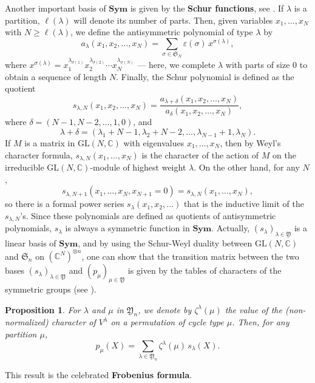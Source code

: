 \documentclass[smallextended,nospthms]{svjour3}
\newtheorem{proposition}[theorem]{Proposition}
\theoremstyle{remark}
\newcommand{\C}{\mathbb{C}}
\newcommand{\sym}{\mathfrak{S}}
\newcommand{\Sym}{\mathbf{Sym}}
\newcommand{\ym}{\mathfrak{Y}}
\newcommand{\GL}{\mathrm{GL}}
\newcommand{\eps}{\varepsilon}
\begin{document}
Another important basis of $\Sym$ is given by the \textbf{Schur functions}, see \cite[\S1.3]{Mac95}. If $\lambda$ is a partition, $\ell(\lambda)$ will denote its number of parts. Then, given variables $x_{1},\ldots,x_{N}$ with $N \geq \ell(\lambda)$, we define the antisymmetric polynomial of type $\lambda$ by
$$a_{\lambda}(x_{1},x_{2},\ldots,x_{N})=\sum_{\sigma \in \sym_{N}} \eps(\sigma)\, x^{\sigma(\lambda)},$$
where $x^{\sigma(\lambda)}=x_{1}^{\lambda_{\sigma(1)}}x_{2}^{\lambda_{\sigma(2)}}\cdots x_{N}^{\lambda_{\sigma(N)}}$ --- here, we complete $\lambda$ with parts of size $0$ to obtain a sequence of length $N$. Finally, the Schur polynomial is defined as the quotient
$$s_{\lambda,N}(x_{1},x_{2},\ldots,x_{N})=\frac{a_{\lambda+\delta}(x_{1},x_{2},\ldots,x_{N})}{a_{\delta}(x_{1},x_{2},\ldots,x_{N})},$$
where $\delta=(N-1,N-2,\ldots,1,0)$, and 
$$\lambda+\delta=(\lambda_{1}+N-1,\lambda_{2}+N-2,\ldots,\lambda_{N-1}+1,\lambda_{N}).$$ If $M$ is a matrix in $\GL(N,\C)$ with eigenvalues $x_{1},\ldots,x_{N}$, then by Weyl's character formula, $s_{\lambda,N}(x_{1},\ldots,x_{N})$ is the character of the action of $M$ on the irreducible $\GL(N,\C)$-module of highest weight $\lambda$. On the other hand, for any $N$, $$s_{\lambda,N+1}(x_{1},\ldots,x_{N},x_{N+1}=0)=s_{\lambda,N}(x_{1},\ldots,x_{N}),$$ so there is a formal power series $s_{\lambda}(x_{1},x_{2},\ldots)$ that is the inductive limit of the $s_{\lambda,N}$'s. Since these polynomials are defined as quotients of antisymmetric polynomials, $s_{\lambda}$ is always a symmetric function in $\Sym$. Actually, $(s_{\lambda})_{\lambda \in \ym}$ is a linear basis of $\Sym$, and by using the Schur-Weyl duality between $\GL(N,\C)$ and $\sym_{n}$ on $(\C^{N})^{\otimes n}$, one can show that the transition matrix between the two bases $(s_{\lambda})_{\lambda \in \ym}$ and $(p_{\mu})_{\mu \in \ym}$ is given by the tables of characters of the symmetric groups (see \cite[\S1.7]{Mac95}).
\begin{proposition}\label{frobenius}
For $\lambda$ and $\mu$ in $\ym_{n}$, we denote by $\zeta^{\lambda}(\mu)$ the value of the (non-normalized) character of $V^{\lambda}$ on a permutation of cycle type $\mu$. Then, for any partition $\mu$,
$$p_{\mu}(X)=\sum_{\lambda \in \ym_{n}} \zeta^{\lambda}(\mu)\,s_{\lambda}(X).$$
\end{proposition}
\noindent This result is the celebrated \textbf{Frobenius formula}.
\bigskip\bigskip
\end{document}
